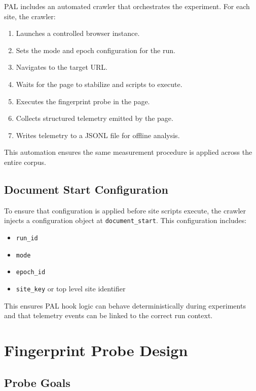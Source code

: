 \documentclass[11pt]{report}
\begin{document}
PAL includes an automated crawler that orchestrates the experiment. For each site, the crawler:

\begin{enumerate}
    \item Launches a controlled browser instance.
    \item Sets the mode and epoch configuration for the run.
    \item Navigates to the target URL.
    \item Waits for the page to stabilize and scripts to execute.
    \item Executes the fingerprint probe in the page.
    \item Collects structured telemetry emitted by the page.
    \item Writes telemetry to a JSONL file for offline analysis.
\end{enumerate}

This automation ensures the same measurement procedure is applied across the entire corpus.

\subsection{Document Start Configuration}

To ensure that configuration is applied before site scripts execute, the crawler injects a configuration object at \texttt{document\_start}. This configuration includes:

\begin{itemize}
    \item \texttt{run\_id}
    \item \texttt{mode}
    \item \texttt{epoch\_id}
    \item \texttt{site\_key} or top level site identifier
\end{itemize}

This ensures PAL hook logic can behave deterministically during experiments and that telemetry events can be linked to the correct run context.

\section{Fingerprint Probe Design}

\subsection{Probe Goals}
\end{document}
